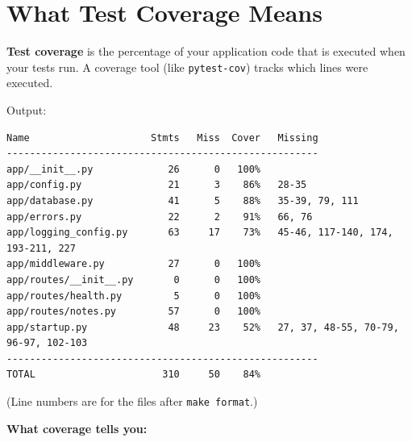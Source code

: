 \setcounter{section}{6}
\section{What Test Coverage Means}\label{17-build-process:177-what-test-coverage-means}

\textbf{Test coverage} is the percentage of your application code that is executed when your tests run. A coverage tool (like \texttt{pytest-cov}) tracks which lines were executed.

\begin{codebox}[short]

\begin{Shaded}
\begin{Highlighting}[]
 \OperatorTok{=}\OperatorTok{=}
\end{Highlighting}
\end{Shaded}

\end{codebox}

\noindent{}Output:

\begin{outputbox}[short]
\begin{Verbatim}[fontsize=\codesize, breaklines, breakanywhere, breaksymbolleft={\tiny\textcolor{muted}{$\hookrightarrow$}}]
Name                     Stmts   Miss  Cover   Missing
------------------------------------------------------
app/__init__.py             26      0   100%
app/config.py               21      3    86%   28-35
app/database.py             41      5    88%   35-39, 79, 111
app/errors.py               22      2    91%   66, 76
app/logging_config.py       63     17    73%   45-46, 117-140, 174, 193-211, 227
app/middleware.py           27      0   100%
app/routes/__init__.py       0      0   100%
app/routes/health.py         5      0   100%
app/routes/notes.py         57      0   100%
app/startup.py              48     23    52%   27, 37, 48-55, 70-79, 96-97, 102-103
------------------------------------------------------
TOTAL                      310     50    84%
\end{Verbatim}
\end{outputbox}

\noindent{}(Line numbers are for the files after \texttt{make\ format}.)

\textbf{What coverage tells you:}

